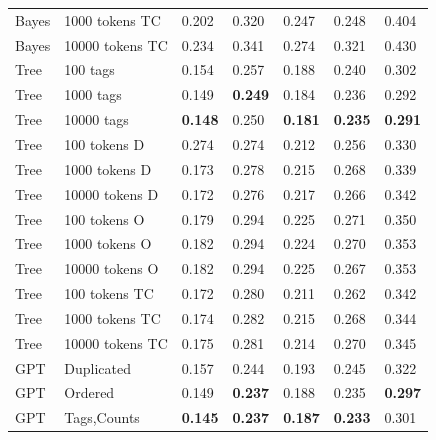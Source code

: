\documentclass[sn-mathphys]{sn-jnl}%
\theoremstyle{thmstyleone}%
\theoremstyle{thmstyletwo}%
\theoremstyle{thmstylethree}%
\begin{document}
\begin{table}[h!]
\begin{center}
\begin{minipage}{\textwidth}
\begin{tabular}{@{}lllllll@{}}
      Bayes     & 1000 tokens TC                      & 0.202            & 0.320           & 0.247          & 0.248           & 0.404          \\
      Bayes     & 10000 tokens TC                     & 0.234            & 0.341           & 0.274          & 0.321           & 0.430          \\
      \midrule
      Tree      & 100 tags                            & 0.154            & 0.257           & 0.188          & 0.240           & 0.302          \\
      Tree      & 1000 tags                           & 0.149            &\textbf{0.249}   & 0.184          & 0.236           & 0.292          \\
      Tree      & 10000 tags                          &\textbf{0.148}    & 0.250           &\textbf{0.181}  & \textbf{0.235}  &\textbf{0.291}  \\
      Tree      & 100 tokens D                        & 0.274            & 0.274           & 0.212          & 0.256           & 0.330          \\
      Tree      & 1000 tokens D                       & 0.173            & 0.278           & 0.215          & 0.268           & 0.339          \\
      Tree      & 10000 tokens D                      & 0.172            & 0.276           & 0.217          & 0.266           & 0.342          \\
      Tree      & 100 tokens O                        & 0.179            & 0.294           & 0.225          & 0.271           & 0.350          \\
      Tree      & 1000 tokens O                       & 0.182            & 0.294           & 0.224          & 0.270           & 0.353          \\
      Tree      & 10000 tokens O                      & 0.182            & 0.294           & 0.225          & 0.267           & 0.353          \\
      Tree      & 100 tokens TC                       & 0.172            & 0.280           & 0.211          & 0.262           & 0.342          \\
      Tree      & 1000 tokens TC                      & 0.174            & 0.282           & 0.215          & 0.268           & 0.344          \\
      Tree      & 10000 tokens TC                     & 0.175            & 0.281           & 0.214          & 0.270           & 0.345          \\
      \midrule
      GPT       & Duplicated\footnotemark[5]          & 0.157            & 0.244           & 0.193          & 0.245           & 0.322          \\
      GPT       & Ordered\footnotemark[6]             & 0.149            & \textbf{0.237}  & 0.188          & 0.235           & \textbf{0.297}          \\
      GPT       & Tags,Counts\footnotemark[7]         & \textbf{0.145}   & \textbf{0.237}  & \textbf{0.187} & \textbf{0.233}  & 0.301          \\


\end{tabular}
\end{minipage}
\end{center}
\end{table}
\end{document}
